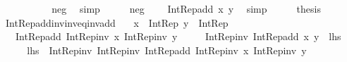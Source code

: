 \begin{isabellebody}
\ \ \ \ {\isacharparenright}{\kern0pt}{\isachardoublequoteclose}\isanewline
\ \ \ \ \isamarkupfalse%
\ neg\ \isamarkupfalse%
\ simp\isanewline
\ \ \isamarkupfalse%
\ \isamarkupfalse%
\ neg\ \isamarkupfalse%
\ {\isachardoublequoteopen}{\isachardot}{\kern0pt}{\isachardot}{\kern0pt}{\isachardot}{\kern0pt}\ {\isacharequal}{\kern0pt}\ Int{\isacharunderscore}{\kern0pt}Rep{\isacharunderscore}{\kern0pt}add\ x\ y{\isachardoublequoteclose}\ \isamarkupfalse%
\ simp\isanewline
\ \ \isamarkupfalse%
\ \isamarkupfalse%
\ {\isacharquery}{\kern0pt}thesis\ \isacommand{{\isachardot}{\kern0pt}}\isamarkupfalse%
\isanewline
{}\isamarkupfalse%
%
\endisatagproof
{\isafoldproof}%
%
\isadelimproof
\isanewline
%
\endisadelimproof
\isanewline
{}\isamarkupfalse%
\ Int{\isacharunderscore}{\kern0pt}Rep{\isacharunderscore}{\kern0pt}add{\isacharunderscore}{\kern0pt}inv{\isacharunderscore}{\kern0pt}inv{\isacharunderscore}{\kern0pt}eq{\isacharunderscore}{\kern0pt}inv{\isacharunderscore}{\kern0pt}add{\isacharcolon}{\kern0pt}\isanewline
\ \ \ {\isachardoublequoteopen}x\ {\isacharcolon}{\kern0pt}\ Int{\isacharunderscore}{\kern0pt}Rep{\isachardoublequoteclose}\ {\isachardoublequoteopen}y\ {\isacharcolon}{\kern0pt}\ Int{\isacharunderscore}{\kern0pt}Rep{\isachardoublequoteclose}\isanewline
\ \ \ {\isachardoublequoteopen}Int{\isacharunderscore}{\kern0pt}Rep{\isacharunderscore}{\kern0pt}add\ {\isacharparenleft}{\kern0pt}Int{\isacharunderscore}{\kern0pt}Rep{\isacharunderscore}{\kern0pt}inv\ x{\isacharparenright}{\kern0pt}\ {\isacharparenleft}{\kern0pt}Int{\isacharunderscore}{\kern0pt}Rep{\isacharunderscore}{\kern0pt}inv\ y{\isacharparenright}{\kern0pt}\ {\isacharequal}{\kern0pt}\isanewline
\ \ \ \ Int{\isacharunderscore}{\kern0pt}Rep{\isacharunderscore}{\kern0pt}inv\ {\isacharparenleft}{\kern0pt}Int{\isacharunderscore}{\kern0pt}Rep{\isacharunderscore}{\kern0pt}add\ x\ y{\isacharparenright}{\kern0pt}{\isachardoublequoteclose}\ {\isacharparenleft}{\kern0pt}\ {\isachardoublequoteopen}{\isacharquery}{\kern0pt}lhs\ {\isacharequal}{\kern0pt}\ {\isacharunderscore}{\kern0pt}{\isachardoublequoteclose}{\isacharparenright}{\kern0pt}\isanewline
%
\isadelimproof
%
\endisadelimproof
%
\isatagproof
{}\isamarkupfalse%
\ {\isacharminus}{\kern0pt}\isanewline
\ \ \isamarkupfalse%
\ {\isachardoublequoteopen}{\isacharquery}{\kern0pt}lhs\ {\isacharequal}{\kern0pt}\ Int{\isacharunderscore}{\kern0pt}Rep{\isacharunderscore}{\kern0pt}inv\ {\isacharparenleft}{\kern0pt}Int{\isacharunderscore}{\kern0pt}Rep{\isacharunderscore}{\kern0pt}inv\ {\isacharparenleft}{\kern0pt}Int{\isacharunderscore}{\kern0pt}Rep{\isacharunderscore}{\kern0pt}add\ {\isacharparenleft}{\kern0pt}Int{\isacharunderscore}{\kern0pt}Rep{\isacharunderscore}{\kern0pt}inv\ x{\isacharparenright}{\kern0pt}\ {\isacharparenleft}{\kern0pt}Int{\isacharunderscore}{\kern0pt}Rep{\isacharunderscore}{\kern0pt}inv\ y{\isacharparenright}{\kern0pt}{\isacharparenright}{\kern0pt}{\isacharparenright}{\kern0pt}{\isachardoublequoteclose}\isanewline

\end{isabellebody}
